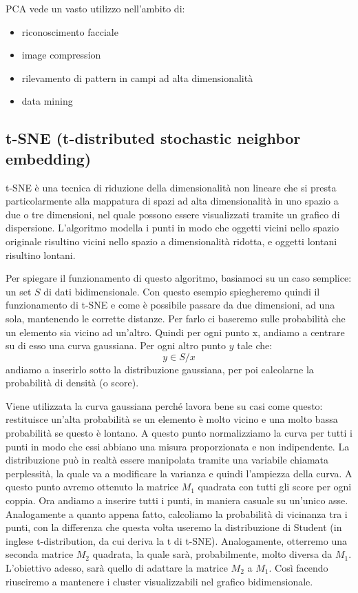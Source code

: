 \documentclass[12pt,italian]{report}
\begin{document}
PCA vede un vasto utilizzo nell'ambito di:
\begin{itemize}
	\item riconoscimento facciale
	\item image compression
	\item rilevamento di pattern in campi ad alta dimensionalità
	\item data mining
\end{itemize}

\pagebreak

\subsection{t-SNE (t-distributed stochastic neighbor embedding)}
t-SNE è una tecnica di riduzione della dimensionalità non lineare che si presta particolarmente alla mappatura di spazi ad alta dimensionalità in uno spazio a due o tre dimensioni, nel quale possono essere visualizzati tramite un grafico di dispersione. L'algoritmo modella i punti in modo che oggetti vicini nello spazio originale risultino vicini nello spazio a dimensionalità ridotta, e oggetti lontani risultino lontani.

Per spiegare il funzionamento di questo algoritmo, basiamoci su un caso semplice: un set $S$ di dati bidimensionale. Con questo esempio spiegheremo quindi il funzionamento di t-SNE e come è possibile passare da due dimensioni, ad una sola, mantenendo le corrette distanze. Per farlo ci baseremo sulle probabilità che un elemento sia vicino ad un'altro. Quindi per ogni punto x, andiamo a centrare su di esso una curva gaussiana. Per ogni altro punto $ y $  tale che:
\[ y \in S / x \]
andiamo a inserirlo sotto la distribuzione gaussiana, per poi calcolarne la probabilità di densità (o score).

Viene utilizzata la curva gaussiana perché lavora bene su casi come questo: restituisce un'alta probabilità se un elemento è molto vicino e una molto bassa probabilità se questo è lontano. A questo punto normalizziamo la curva per tutti i punti in modo che essi abbiano una misura proporzionata e non indipendente. La distribuzione può in realtà essere manipolata tramite una variabile chiamata perplessità, la quale va a modificare la varianza e quindi l'ampiezza della curva.
A questo punto avremo ottenuto la matrice $ M_{1} $ quadrata con tutti gli score per ogni coppia. Ora andiamo a inserire tutti i punti, in maniera casuale su un'unico asse. Analogamente a quanto appena fatto, calcoliamo la probabilità di vicinanza tra i punti, con la differenza che questa volta useremo la distribuzione di Student (in inglese t-distribution, da cui deriva la t di t-SNE). Analogamente, otterremo una seconda matrice $ M_{2} $ quadrata, la quale sarà, probabilmente, molto diversa da $ M_{1} $. L'obiettivo adesso, sarà quello di adattare la matrice $ M_{2} $ a $ M_{1} $. Così facendo riusciremo a mantenere i cluster visualizzabili nel grafico bidimensionale.
\end{document}
